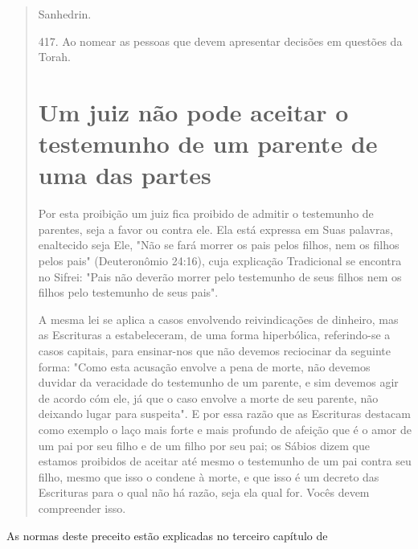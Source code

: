 \begin{quote}
Sanhedrin.

417. Ao nomear as pessoas que devem apresentar decisões em questões da
Torah.

\section{Um juiz não pode aceitar o testemunho de um parente de uma das partes}

Por esta proibição um juiz fica proibido de admitir o testemunho de
parentes, seja a favor ou contra ele. Ela está expressa em Suas
palavras, enal­tecido seja Ele, "Não se fará morrer os pais pelos
filhos, nem os filhos pelos pais" (Deuteronômio 24:16), cuja explicação
Tradicional se encontra no Sifrei: "Pais não deverão morrer pelo
testemunho de seus filhos nem os filhos pelo testemunho de seus pais".

A mesma lei se aplica a casos envolvendo reivindicações de dinhei­ro,
mas as Escrituras a estabeleceram, de uma forma hiperbólica,
referindo-se a casos capitais, para ensinar-nos que não devemos
reciocinar da seguinte for­ma: "Como esta acusação envolve a pena de
morte, não devemos duvidar da veracidade do testemunho de um parente, e
sim devemos agir de acordo cóm ele, já que o caso envolve a morte de seu
parente, não deixando lugar para sus­peita". E por essa razão que as
Escrituras destacam como exemplo o laço mais forte e mais profundo de
afeição que é o amor de um pai por seu filho e de um filho por seu pai;
os Sábios dizem que estamos proibidos de aceitar até mes­mo o testemunho
de um pai contra seu filho, mesmo que isso o condene à morte, e que isso
é um decreto das Escrituras para o qual não há razão, seja ela qual for.
Vocês devem compreender isso.
\end{quote}

As normas deste preceito estão explicadas no terceiro capítulo de

